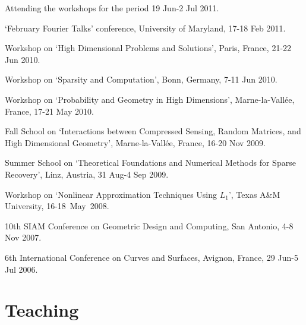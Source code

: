 \documentclass[11pt]{article}
\begin{document}
Attending the workshops for the period 19 Jun-2 Jul 2011.
\item `February Fourier Talks' conference, University of Maryland, 17-18 Feb 2011.
\item Workshop on `High Dimensional Problems and Solutions', Paris, France, 21-22 Jun 2010.
\item Workshop on `Sparsity and Computation', Bonn, Germany, 7-11 Jun 2010.
\item Workshop on `Probability and Geometry in High Dimensions', Marne-la-Vall\'ee, France, 17-21 May 2010.
\item Fall School on `Interactions between Compressed Sensing, Random Matrices, and High Dimensional Geometry', Marne-la-Vall\'ee, France, 16-20 Nov 2009.
\item Summer School on `Theoretical Foundations and Numerical Methods for Sparse Recovery', Linz, Austria, 31 Aug-4 Sep 2009.
\item Workshop on `Nonlinear  Approximation Techniques Using  $L_1$', Texas A\&M University, 16-18~May~2008.
\item 10th SIAM Conference on Geometric Design and Computing, San Antonio, 4-8 Nov 2007.
\item 6th International Conference on Curves and Surfaces, Avignon, France, 29 Jun-5 Jul  2006.
\eitemize


\section{Teaching}
\end{document}
